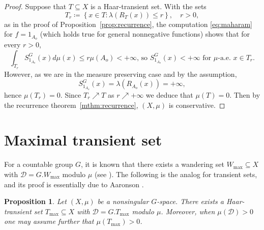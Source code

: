 \documentclass{amsart}
\numberwithin{equation}{subsection}
\newtheorem{prop}[thm]{Proposition}
\begin{document}
\begin{proof}
Suppose that \(T\subseteq X\) is a Haar-transient set. With the sets
\[T_{r}\coloneqq \left\{ x\in T:\lambda\left(R_{T}\left(x\right)\right)\leq r\right\} ,\quad r>0,\]
as in the proof of Proposition~\ref{prop:recurrence}, the computation \eqref{eq:maharam} for \(f=1_{A_{o}}\) (which holds true for general nonnegative functions) shows that for every \(r>0\),
\[\int_{T_{r}}S_{1_{A_{o}}}^{G}\left(x\right)d\mu\left(x\right)\leq r\mu\left(A_{o}\right)<+\infty\text{, so }S_{1_{A_{o}}}^{G}\left(x\right)<+\infty\text{ for }\mu\text{-a.e. }x\in T_{r}.\]
However, as we are in the measure preserving case and by the assumption,
\[S_{1_{A_{o}}}^{G}\left(x\right)=\lambda\left(R_{A_{o}}\left(x\right)\right)=+\infty,\]
hence \(\mu\left(T_{r}\right)=0\). Since \(T_{r}\nearrow T\) as \(r\nearrow +\infty\) we deduce that \(\mu\left(T\right)=0\). Then by the recurrence theorem~\ref{mthm:recurrence}, \(\left(X,\mu\right)\) is conservative.
\end{proof}

\section{Maximal transient set}

For a countable group \(G\), it is known that there exists a wandering set \(W_{\max}\subseteq X\) with \(\mathcal{D}=G.W_{\max}\) modulo \(\mu\) (see \cite[Proposition 1.6.1]{aaronson1997introduction}). The following is the analog for transient sets, and its proof is essentially due to Aaronson \cite[Proposition 1.6.1]{aaronson1997introduction}.

\begin{prop}
Let \(\left(X,\mu\right)\) be a nonsingular \(G\)-space. There exists a Haar-transient set \(T_{\max}\subseteq X\) with \(\mathcal{D}=G.T_{\max}\) modulo \(\mu\). Moreover, when \(\mu\left(\mathcal{D}\right)>0\) one may assume further that \(\mu\left(T_{\max}\right)>0\).
\end{prop}
\end{document}
